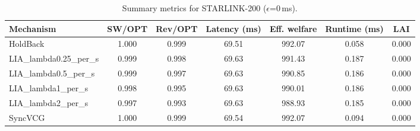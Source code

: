 \begin{table}[t]
\centering
\small
\setlength{\tabcolsep}{6pt}
\begin{tabular}{lcccccc}
\toprule
Mechanism & SW/OPT & Rev/OPT & Latency (ms) & Eff. welfare & Runtime (ms) & LAI \\
\midrule
HoldBack & 1.000 & 0.999 & 69.51 & 992.07 & 0.058 & 0.000 \\
LIA_lambda0.25_per_s & 0.999 & 0.998 & 69.63 & 991.43 & 0.187 & 0.000 \\
LIA_lambda0.5_per_s & 0.999 & 0.997 & 69.63 & 990.85 & 0.186 & 0.000 \\
LIA_lambda1_per_s & 0.998 & 0.995 & 69.63 & 990.01 & 0.186 & 0.000 \\
LIA_lambda2_per_s & 0.997 & 0.993 & 69.63 & 988.93 & 0.185 & 0.000 \\
SyncVCG & 1.000 & 0.999 & 69.54 & 992.07 & 0.094 & 0.000 \\
\bottomrule
\end{tabular}
\caption{Summary metrics for STARLINK-200 ($\epsilon$=0\,ms).}
\label{tab:starlink200_eps0p0}
\end{table}
